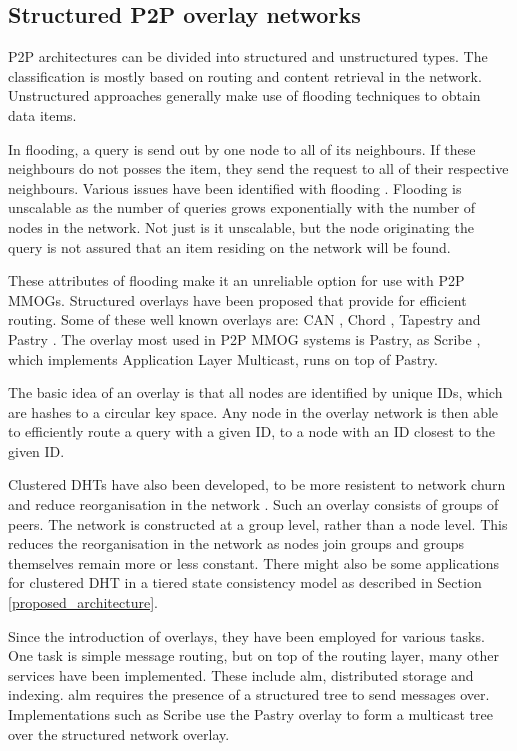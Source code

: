 \documentclass[journal,oneside,a4paper,onecolumn]{IEEEtran}
\begin{document}
\subsection{Structured P2P overlay networks}
\label{overlays}

P2P architectures can be divided into structured and unstructured types. The classification is mostly based on routing and content retrieval in the network. Unstructured approaches generally make use of flooding techniques to obtain data items.

In flooding, a query is send out by one node to all of its neighbours. If these neighbours do not posses the item, they send the request to all of their respective neighbours. Various issues have been identified with flooding \cite{overlay_scalable_alternative}. Flooding is unscalable as the number of queries grows exponentially with the number of nodes in the network. Not just is it unscalable, but the node originating the query is not assured that an item residing on the network will be found.

These attributes of flooding make it an unreliable option for use with P2P MMOGs. Structured overlays have been proposed that provide for efficient routing. Some of these well known overlays are: CAN \cite{CAN}, Chord \cite{chord}, Tapestry \cite{tapestry} and Pastry \cite{pastry}. The overlay most used in P2P MMOG systems is Pastry, as Scribe \cite{scribe}, which implements Application Layer Multicast, runs on top of Pastry.

The basic idea of an overlay is that all nodes are identified by unique IDs, which are hashes to a circular key space. Any node in the overlay network is then able to efficiently route a query with a given ID, to a node with an ID closest to the given ID.

Clustered DHTs have also been developed, to be more resistent to network churn and reduce reorganisation in the network \cite{cdht}. Such an overlay consists of groups of peers. The network is constructed at a group level, rather than a node level. This reduces the reorganisation in the network as nodes join groups and groups themselves remain more or less constant. There might also be some applications for clustered DHT in a tiered state consistency model as described in Section \ref{proposed_architecture}.

Since the introduction of overlays, they have been employed for various tasks. One task is simple message routing, but on top of the routing layer, many other services have been implemented. These include \ac{alm}, distributed storage \cite{past_storage_focus} and indexing. \ac{alm} requires the presence of a structured tree to send messages over. Implementations such as Scribe use the Pastry overlay to form a multicast tree over the structured network overlay.
\end{document}
